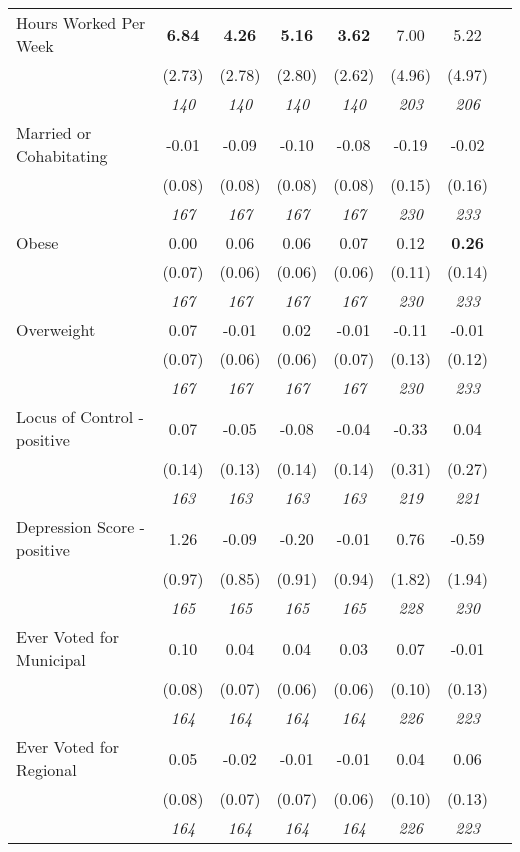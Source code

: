 \begin{tabular}{l c c c c c c c}
Hours Worked Per Week & \textbf{ 6.84 } & \textbf{ 4.26 } & \textbf{ 5.16 } & \textbf{3.62} & 7.00 & 5.22 \\
& (2.73) & (2.78) & (2.80) & (2.62) & (4.96) & (4.97) \\
& \textit{ 140 } & \textit{ 140 } & \textit{ 140 } & \textit{ 140 } & \textit{ 203 } & \textit{ 206 } \\
Married or Cohabitating & -0.01 & -0.09 & -0.10 & -0.08 & -0.19 & -0.02 \\
& (0.08) & (0.08) & (0.08) & (0.08) & (0.15) & (0.16) \\
& \textit{ 167 } & \textit{ 167 } & \textit{ 167 } & \textit{ 167 } & \textit{ 230 } & \textit{ 233 } \\
Obese & 0.00 & 0.06 & 0.06 & 0.07 & 0.12 & \textbf{ 0.26 } \\
& (0.07) & (0.06) & (0.06) & (0.06) & (0.11) & (0.14) \\
& \textit{ 167 } & \textit{ 167 } & \textit{ 167 } & \textit{ 167 } & \textit{ 230 } & \textit{ 233 } \\
Overweight & 0.07 & -0.01 & 0.02 & -0.01 & -0.11 & -0.01 \\
& (0.07) & (0.06) & (0.06) & (0.07) & (0.13) & (0.12) \\
& \textit{ 167 } & \textit{ 167 } & \textit{ 167 } & \textit{ 167 } & \textit{ 230 } & \textit{ 233 } \\
Locus of Control - positive & 0.07 & -0.05 & -0.08 & -0.04 & -0.33 & 0.04 \\
& (0.14) & (0.13) & (0.14) & (0.14) & (0.31) & (0.27) \\
& \textit{ 163 } & \textit{ 163 } & \textit{ 163 } & \textit{ 163 } & \textit{ 219 } & \textit{ 221 } \\
Depression Score - positive & 1.26 & -0.09 & -0.20 & -0.01 & 0.76 & -0.59 \\
& (0.97) & (0.85) & (0.91) & (0.94) & (1.82) & (1.94) \\
& \textit{ 165 } & \textit{ 165 } & \textit{ 165 } & \textit{ 165 } & \textit{ 228 } & \textit{ 230 } \\
Ever Voted for Municipal & 0.10 & 0.04 & 0.04 & 0.03 & 0.07 & -0.01 \\
& (0.08) & (0.07) & (0.06) & (0.06) & (0.10) & (0.13) \\
& \textit{ 164 } & \textit{ 164 } & \textit{ 164 } & \textit{ 164 } & \textit{ 226 } & \textit{ 223 } \\
Ever Voted for Regional & 0.05 & -0.02 & -0.01 & -0.01 & 0.04 & 0.06 \\
& (0.08) & (0.07) & (0.07) & (0.06) & (0.10) & (0.13) \\
& \textit{ 164 } & \textit{ 164 } & \textit{ 164 } & \textit{ 164 } & \textit{ 226 } & \textit{ 223 } \\
\bottomrule
\end{tabular}
